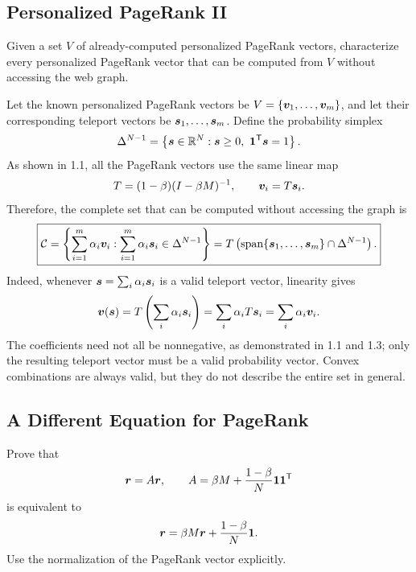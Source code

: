 \subsection{Personalized PageRank II}

Given a set $V$ of already-computed personalized PageRank vectors,
characterize every personalized PageRank vector that can be computed from
$V$ without accessing the web graph.

\begin{solution}
Let the known personalized PageRank vectors be
$V=\{\bm{v}_1,\ldots,\bm{v}_m\}$, and let their corresponding teleport
vectors be $\bm{s}_1,\ldots,\bm{s}_m$. Define the probability simplex
\[
  \Delta^{N-1}
  =\left\{\bm{s}\in\mathbb{R}^N:
    \bm{s}\geq 0,\ \bm{1}^{\mathsf T}\bm{s}=1\right\}.
\]
As shown in 1.1, all the PageRank vectors use the same linear map
\[
  T=(1-\beta)(I-\beta M)^{-1},
  \qquad \bm{v}_i=T\bm{s}_i.
\]
Therefore, the complete set that can be computed without accessing the graph
is
\[
  \boxed{
  \mathcal{C}
  =
  \left\{
    \sum_{i=1}^{m}\alpha_i\bm{v}_i:
    \sum_{i=1}^{m}\alpha_i\bm{s}_i\in\Delta^{N-1}
  \right\}
  =
  T\left(
    \operatorname{span}\{\bm{s}_1,\ldots,\bm{s}_m\}
    \cap\Delta^{N-1}
  \right).
  }
\]
Indeed, whenever
$\bm{s}=\sum_i\alpha_i\bm{s}_i$ is a valid teleport vector, linearity
gives
\[
  \bm{v}(\bm{s})
  =T\left(\sum_i\alpha_i\bm{s}_i\right)
  =\sum_i\alpha_iT\bm{s}_i
  =\sum_i\alpha_i\bm{v}_i.
\]
The coefficients need not all be nonnegative, as demonstrated in 1.1 and
1.3; only the resulting teleport vector must be a valid probability vector.
Convex combinations are always valid, but they do not describe the entire
set in general.
\end{solution}

\subsection{A Different Equation for PageRank}

Prove that
\[
  \bm{r}=A\bm{r},
  \qquad
  A=\beta M+\frac{1-\beta}{N}\bm{1}\bm{1}^{\mathsf T}
\]
is equivalent to
\[
  \bm{r}=\beta M\bm{r}+\frac{1-\beta}{N}\bm{1}.
\]
Use the normalization of the PageRank vector explicitly.

